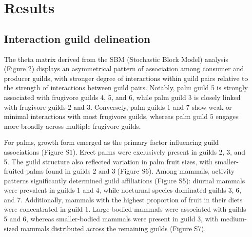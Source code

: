 \documentclass[
]{agujournal2019}
\begin{document}
\section{Results}\label{results}

\subsection{\texorpdfstring{\textbf{Interaction guild
delineation}}{Interaction guild delineation}}\label{interaction-guild-delineation}

The theta matrix derived from the SBM (Stochastic Block Model) analysis
(Figure 2) displays an asymmetrical pattern of association among
consumer and producer guilds, with stronger degree of interactions
within guild pairs relative to the strength of interactions between
guild pairs. Notably, palm guild 5 is strongly associated with frugivore
guilds 4, 5, and 6, while palm guild 3 is closely linked with frugivore
guilds 2 and 3. Conversely, palm guilds 1 and 7 show weak or minimal
interactions with most frugivore guilds, whereas palm guild 5 engages
more broadly across multiple frugivore guilds.

For palms, growth form emerged as the primary factor influencing guild
associations (Figure S1). Erect palms were exclusively present in guilds
2, 3, and 5. The guild structure also reflected variation in palm fruit
sizes, with smaller-fruited palms found in guilds 2 and 3 (Figure S6).
Among mammals, activity patterns significantly determined guild
affiliations (Figure S5): diurnal mammals were prevalent in guilds 1 and
4, while nocturnal species dominated guilds 3, 6, and 7. Additionally,
mammals with the highest proportion of fruit in their diets were
concentrated in guild 1. Large-bodied mammals were associated with
guilds 5 and 6, whereas smaller-bodied mammals were present in guild 3,
with medium-sized mammals distributed across the remaining guilds
(Figure S7).
\end{document}
